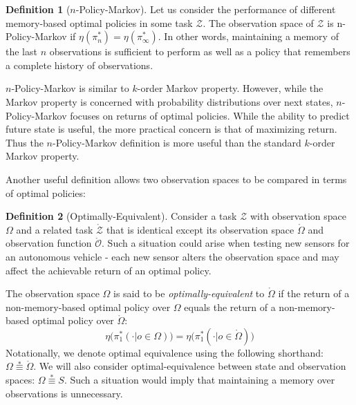 \documentclass{article} %
\theoremstyle{definition}
\newtheorem{definition}{Definition}[section]
\begin{document}
\begin{definition}[$n$-Policy-Markov]
Let us consider the performance of different memory-based optimal
policies in some task $\mathcal{Z}$. The observation space of
$\mathcal{Z}$ is n-Policy-Markov if $\eta(\pi^*_n) =
\eta(\pi^*_\infty)$. In other words, maintaining a memory of the last
$n$ observations is sufficient to perform as well as a policy that
remembers a complete history of observations.

$n$-Policy-Markov is similar to $k$-order Markov property. However,
while the Markov property is concerned with probability distributions
over next states, $n$-Policy-Markov focuses on returns of optimal
policies. While the ability to predict future state is useful, the
more practical concern is that of maximizing return. Thus the
$n$-Policy-Markov definition is more useful than the standard
$k$-order Markov property.
\end{definition}

Another useful definition allows two observation spaces to be compared
in terms of optimal policies:

\begin{definition}[Optimally-Equivalent]
\label{def:opt-equiv}
Consider a task $\mathcal{Z}$ with observation space $\Omega$ and a
related task $\mathring{\mathcal{Z}}$ that is identical except its
observation space $\mathring{\Omega}$ and observation function
$\mathring{\mathcal{O}}$. Such a situation could arise when testing
new sensors for an autonomous vehicle - each new sensor alters the
observation space and may affect the achievable return of an optimal
policy.

The observation space $\Omega$ is said to be
\textit{optimally-equivalent} to $\mathring{\Omega}$ if the return of
a non-memory-based optimal policy over $\Omega$ equals the return of a
non-memory-based optimal policy over $\mathring{\Omega}$:
\[
\eta \big(\pi^*_1(\cdot|o \in \Omega) \big) = \eta \big(\pi^*_1(\cdot|o \in \mathring{\Omega}) \big)
\]
Notationally, we denote optimal equivalence using the following
shorthand: $\Omega \overset{*}{\equiv} \mathring{\Omega}$. We will
also consider optimal-equivalence between state and observation
spaces: $\Omega \overset{*}{\equiv} S$. Such a situation would imply
that maintaining a memory over observations is unnecessary.
\end{definition}
\end{document}
